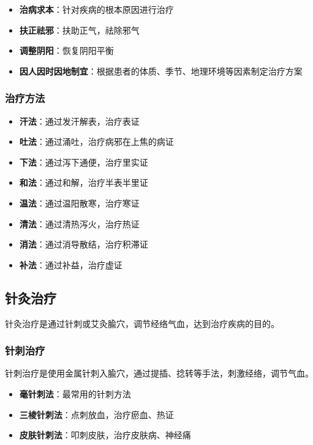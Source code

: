 \documentclass[12pt,UTF8]{ctexbook}
\begin{document}
\begin{itemize}
\item \textbf{治病求本}：针对疾病的根本原因进行治疗
\item \textbf{扶正祛邪}：扶助正气，祛除邪气
\item \textbf{调整阴阳}：恢复阴阳平衡
\item \textbf{因人因时因地制宜}：根据患者的体质、季节、地理环境等因素制定治疗方案
\end{itemize}

\subsubsection{治疗方法}

\begin{itemize}
\item \textbf{汗法}：通过发汗解表，治疗表证
\item \textbf{吐法}：通过涌吐，治疗病邪在上焦的病证
\item \textbf{下法}：通过泻下通便，治疗里实证
\item \textbf{和法}：通过和解，治疗半表半里证
\item \textbf{温法}：通过温阳散寒，治疗寒证
\item \textbf{清法}：通过清热泻火，治疗热证
\item \textbf{消法}：通过消导散结，治疗积滞证
\item \textbf{补法}：通过补益，治疗虚证
\end{itemize}

\subsection{针灸治疗}

针灸治疗是通过针刺或艾灸腧穴，调节经络气血，达到治疗疾病的目的。

\subsubsection{针刺治疗}

针刺治疗是使用金属针刺入腧穴，通过提插、捻转等手法，刺激经络，调节气血。

\begin{itemize}
\item \textbf{毫针刺法}：最常用的针刺方法
\item \textbf{三棱针刺法}：点刺放血，治疗瘀血、热证
\item \textbf{皮肤针刺法}：叩刺皮肤，治疗皮肤病、神经痛
\end{itemize}
\end{document}
